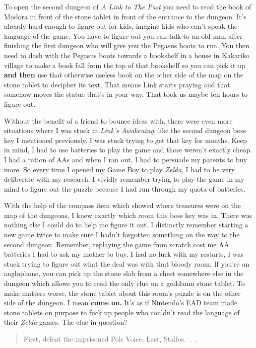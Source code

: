 \documentclass{book}
\begin{document}
To open the second dungeon of \emph{A Link to The Past} you need to read the book of Mudora in front of the stone tablet in front of the entrance to the dungeon. It’s already hard enough to figure out for kids, imagine kids who can’t speak the language of the game. You have to figure out you can talk to an old man after finishing the first dungeon who will give you the Pegasus boots to run. You then need to dash with the Pegasus boots towards a bookshelf in a house in Kakariko village to make a book fall from the top of that bookshelf so you can pick it up \textbf{and then} use that otherwise useless book on the other side of the map on the stone tablet to decipher its text. That means Link starts praying and that somehow moves the statue that’s in your way. That took us maybe ten hours to figure out.\par
Without the benefit of a friend to bounce ideas with, there were even more situations where I was stuck in \emph{Link’s Awakening}, like the second dungeon boss key I mentioned previously. I was stuck trying to get that key for months. Keep in mind, I had to use batteries to play the game and those weren’t exactly cheap. I had a ration of AAs and when I ran out, I had to persuade my parents to buy more. So every time I opened my Game Boy to play \emph{Zelda}, I had to be very deliberate with my research. I vividly remember trying to play the game in my mind to figure out the puzzle because I had run through my quota of batteries.\par
With the help of the compass item which showed where treasures were on the map of the dungeons, I knew exactly which room this boss key was in. There was nothing else I could do to help me figure it out. I distinctly remember starting a new game twice to make sure I hadn’t forgotten something on the way to the second dungeon. Remember, replaying the game from scratch cost me AA batteries I had to ask my mother to buy. I had no luck with my restarts, I was stuck trying to figure out what the deal was with that bloody room. If you’re an anglophone, you can pick up the stone slab from a chest somewhere else in the dungeon which allows you to read the only clue on a goddamn stone tablet. To make matters worse, the stone tablet about this room’s puzzle is on the other side of the dungeon. I mean \textbf{come on.} It’s as if Nintendo’s EAD team made stone tablets on purpose to fuck up people who couldn’t read the language of their \emph{Zelda} games. The clue in question?\par
\begin{quote}
First, defeat the imprisoned Pols Voice, Last, Stalfos.~.~.\par
\end{quote} \par
\end{document}
